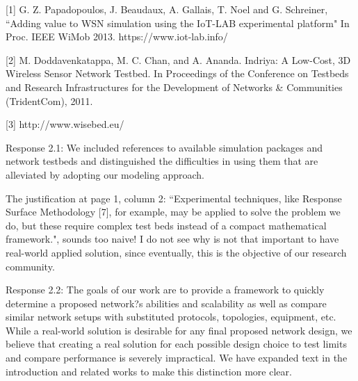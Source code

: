 \documentclass[12pt, letterpaper, onecolumn]{IEEEtran}
\begin{document}
[1] G. Z. Papadopoulos, J. Beaudaux, A. Gallais, T. Noel and G. Schreiner, ``Adding value to WSN simulation using the IoT-LAB experimental platform" In Proc. IEEE WiMob 2013.
 https://www.iot-lab.info/

[2] M. Doddavenkatappa, M. C. Chan, and A. Ananda. Indriya: A Low-Cost, 3D Wireless Sensor Network Testbed. In Proceedings of the Conference on Testbeds and Research Infrastructures for the Development of Networks \& Communities (TridentCom), 2011.

[3] http://www.wisebed.eu/

{\color{blue}
Response 2.1: We included references to available simulation packages and network testbeds and distinguished the difficulties in using them that are alleviated by adopting our modeling approach.
}

The justification at page 1, column 2: ``Experimental techniques, like Response Surface Methodology [7], for example, may be applied to solve the problem we do, but these require complex test beds instead of a compact mathematical framework.", sounds too naive! I do not see why is not that important to have real-world applied solution, since eventually, this is the objective of our research community. 

{\color{blue}
Response 2.2: The goals of our work are to provide a framework to quickly determine a proposed network?s abilities and scalability as well as compare similar network setups with substituted protocols, topologies, equipment, etc. While a real-world solution is desirable for any final proposed network design, we believe that creating a real solution for each possible design choice to test limits and compare performance is severely impractical. We have expanded text in the introduction and related works to make this distinction more clear.
}
\end{document}
